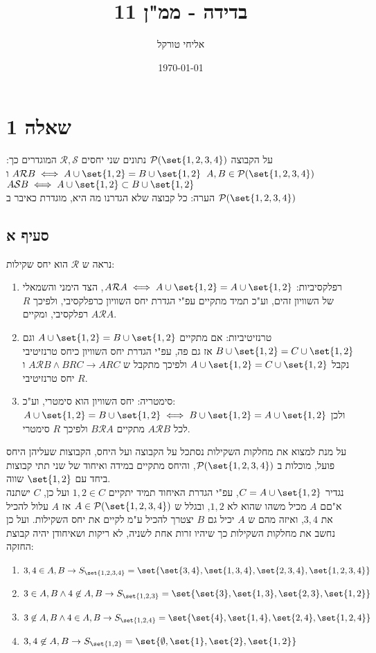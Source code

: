 \documentclass{article}
\title{בדידה - ממ"ן 11}
\author{אליחי טורקל \ID}
\date\today
\DeclarePairedDelimiter\set\{\}
\begin{document}
	\maketitle %

	\section*{שאלה 1}
	על הקבוצה $\PP(\set{1,2,3,4})$ נתונים שני יחסים $\mathcal{R}, \mathcal{S}$ המוגדרים כך:
	 $A,B \in \PP(\set{1,2,3,4})$ $A \mathcal{R} B \iff A \cup \set{1,2} = B \cup \set{1,2}$
	ו $A \mathcal{S} B \iff A \cup \set{1,2} \subset B \cup \set{1,2}$ \\
	הערה: כל קבוצה שלא הגדרנו מה היא, מוגדרת כאיבר ב $\PP(\set{1,2,3,4})$
	\subsection*{סעיף א}
	נראה ש $\mathcal{R}$ הוא יחס שקילות:
\begin{enumerate}
	\item רפלקסיביות:
	$A \mathcal{R} A \iff A \cup \set{1,2} = A \cup \set{1,2}$,
	הצד הימני והשמאלי של השוויון זהים, וע"כ תמיד מתקיים עפ"י הגדרת יחס השוויון כרפלקסיבי,
	ולפיכך $R$ רפלקסיבי, ומקיים $A \mathcal{R} A$.
	\item טרנזיטיביות:
	אם מתקיים $A \cup \set{1,2} = B \cup \set{1,2}$
	וגם $B \cup \set{1,2} = C \cup \set{1,2}$
	אז גם פה, עפ"י הגדרת יחס השוויון כיחס טרנזיטיבי נקבל $A \cup \set{1,2} = C \cup \set{1,2}$
ולפיכך מתקבל ש $A \mathcal{R} B \land BRC \to ARC$ ו $R$ יחס טרנזיטיבי.
	\item סימטריה:
	יחס השוויון הוא סימטרי, וע"כ:\\
	$A \cup \set{1,2} = B \cup \set{1,2} \iff
	B \cup \set{1,2} = A \cup \set{1,2}$
	ולכן לכל $A \mathcal{R} B$ מתקיים $B \mathcal{R} A$ ולפיכך $R$ סימטרי.
\end{enumerate}
על מנת למצוא את מחלקות השקילות נסתכל על הקבוצה ועל היחס,
הקבוצות שעליהן היחס פועל, מוכלות ב $\PP(\set{1,2,3,4})$,
והיחס מתקיים במידה ואיחוד של שני תתי קבוצות ביחד עם $\set{1,2}$ שווה. \\
נגדיר $C = A \cup \set{1,2}$, עפ"י הגדרת האיחוד תמיד יתקיים $1,2 \in C$
ועל כן, $C$ ישתנה א"םם $A$ מכיל משהו שהוא לא $1,2$, ובגלל ש $A \in \PP(\set{1,2,3,4})$
אז $A$ עלול להכיל את $3,4$, ואיזה מהם ש $A$ יכיל גם $B$ יצטרך להכיל ע"מ לקיים את יחס השקילות.
ועל כן נחשב את מחלקות השקילות כך שיהיו זרות אחת לשניה, לא ריקות ושאיחודן יהיה קבוצת החזקה:
\begin{enumerate}
	\item $3,4 \in A,B \to
	S_{\set{1,2,3,4}}=\set{\set{3,4}, \set{1,3,4}, \set{2,3,4}, \set{1,2,3,4}}$
	\item $3 \in A,B \land 4 \not\in A,B \to
	S_{\set{1,2,3}}=\set{\set{3}, \set{1,3}, \set{2,3}, \set{1,2}}$
	\item $3 \not\in A,B \land 4 \in A,B \to
	S_{\set{1,2,4}}=\set{\set{4}, \set{1,4}, \set{2,4}, \set{1,2,4}}$
	\item $3,4 \not\in A,B \to
	S_{\set{1,2}}=\set{\emptyset, \set{1}, \set{2}, \set{1,2}}$
\end{enumerate}
	\pagebreak
\end{document}

